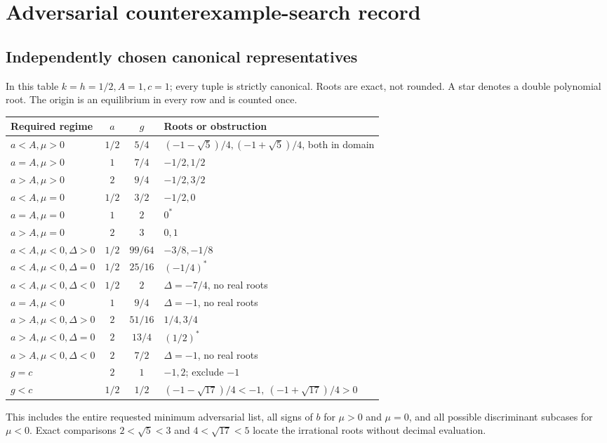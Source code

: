 \documentclass[11pt]{article}
\begin{document}
\section{Adversarial counterexample-search record}

\subsection{Independently chosen canonical representatives}
In this table \(k=h=1/2,A=1,c=1\); every tuple is strictly canonical.
Roots are exact, not rounded. A star denotes a double polynomial
root. The origin is an equilibrium in every row and is counted once.
\begin{longtable}{@{}P{0.28\textwidth}c c P{0.33\textwidth}@{}}
\toprule
Required regime & \(a\)&\(g\)& Roots or obstruction\\
\midrule
\endhead
\(a<A,\mu>0\)&\(1/2\)&\(5/4\)&
\((-1-\sqrt5)/4,(-1+\sqrt5)/4\), both in domain\\
\(a=A,\mu>0\)&\(1\)&\(7/4\)& \(-1/2,1/2\)\\
\(a>A,\mu>0\)&\(2\)&\(9/4\)& \(-1/2,3/2\)\\
\(a<A,\mu=0\)&\(1/2\)&\(3/2\)& \(-1/2,0\)\\
\(a=A,\mu=0\)&\(1\)&\(2\)& \(0^*\)\\
\(a>A,\mu=0\)&\(2\)&\(3\)& \(0,1\)\\
\(a<A,\mu<0,\Delta>0\)&\(1/2\)&\(99/64\)& \(-3/8,-1/8\)\\
\(a<A,\mu<0,\Delta=0\)&\(1/2\)&\(25/16\)& \((-1/4)^*\)\\
\(a<A,\mu<0,\Delta<0\)&\(1/2\)&\(2\)& \(\Delta=-7/4\), no real roots\\
\(a=A,\mu<0\)&\(1\)&\(9/4\)& \(\Delta=-1\), no real roots\\
\(a>A,\mu<0,\Delta>0\)&\(2\)&\(51/16\)& \(1/4,3/4\)\\
\(a>A,\mu<0,\Delta=0\)&\(2\)&\(13/4\)& \((1/2)^*\)\\
\(a>A,\mu<0,\Delta<0\)&\(2\)&\(7/2\)& \(\Delta=-1\), no real roots\\
\(g=c\)&\(2\)&\(1\)& \(-1,2\); exclude \(-1\)\\
\(g<c\)&\(1/2\)&\(1/2\)&
\((-1-\sqrt{17})/4<-1,\ (-1+\sqrt{17})/4>0\)\\
\bottomrule
\end{longtable}
This includes the entire requested minimum adversarial list, all
signs of \(b\) for \(\mu>0\) and \(\mu=0\), and all possible
discriminant subcases for \(\mu<0\).
Exact comparisons \(2<\sqrt5<3\) and \(4<\sqrt{17}<5\)
locate the irrational roots without decimal evaluation.
\end{document}
